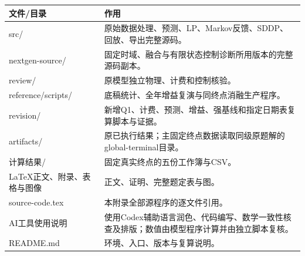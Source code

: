 \begin{longtable}{p{4.2cm}p{10cm}}\toprule 文件/目录&作用\\\midrule
src/&原始数据处理、预测、LP、Markov反馈、SDDP、回放、导出完整源码。\\
nextgen-source/&固定时域、融合与有限状态控制诊断所用版本的完整源码副本。\\
review/&原模型独立物理、计费和控制核验。\\
reference/scripts/&底稿统计、全年增益复演与同终点消融生产程序。\\
revision/&新增Q1、计费、预测、增益、强基线和指定日期表复算脚本与证据。\\
artifacts/&原已执行结果；主固定终点数据读取同级原题解的global-terminal目录。\\
计算结果/&固定真实终点的五份工作簿与CSV。\\
LaTeX正文、附录、表格与图像&正文、证明、完整题定表与图。\\
source-code.tex&本附录全部源程序的逐文件引用。\\
AI工具使用说明&使用Codex辅助语言润色、代码编写、数学一致性核查及排版；数值由模型程序计算并由独立脚本复核。\\
README.md&环境、入口、版本与复算说明。\\\bottomrule\end{longtable}